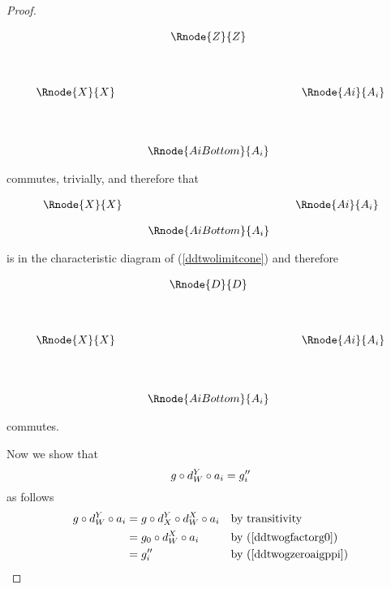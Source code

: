 \documentclass[10pt,a4paper]{scrartcl}
\begin{document}
\begin{proof}
\begin{center}
\begin{equation*}
\begin{array}{cp{0.3cm}c    p{0.3cm}  c }
               & & \Rnode{Z}{Z} & &                                  \\ [1.3cm]
\Rnode{X}{X}   &&                   & & \Rnode{Ai}{A_i}   \\ [1.4cm]
               & & \Rnode{AiBottom}{A_i} & &   
\end{array}
\end{equation*}
\end{center}
 commutes, trivially, and therefore that
\begin{center}
\begin{equation*}
\begin{array}{cp{0.1cm}cp{0.1cm} c}
\Rnode{X}{X}& &                & & \Rnode{Ai}{A_i} \\ [0.4cm]
            & &\Rnode{AiBottom}{A_i}
\end{array}
\end{equation*}
\end{center}

is in the characteristic diagram of (\ref{ddtwolimitcone}) and therefore
\begin{center}
\begin{equation}
\label{ddtwogzeroaigppi}
\begin{array}{cp{0.3cm}c    p{0.3cm}  c }
               & & \Rnode{D}{D} & &                                  \\ [1.3cm]
\Rnode{X}{X}   &&                   & & \Rnode{Ai}{A_i}   \\ [1.4cm]
               & & \Rnode{AiBottom}{A_i} & &   
\end{array}
\end{equation}
\end{center}
 commutes.

\noindent
Now we show that
\begin{equation}
\label{ddtwogaigpp}
g \circ d^{Y}_{W} \circ a_i=g''_i
\end{equation}
as follows
\begin{align*}
g \circ d^{Y}_{W} \circ a_i                      
     &= g \circ d^{Y}_{X} \circ d^{X}_{W} \circ a_i  && \mbox{by transitivity}  \\
     &= g_0 \circ d^{X}_{W} \circ a_i          && \mbox{by (\ref{ddtwogfactorg0})}  \\
		&=g''_i                                      && \mbox{by (\ref{ddtwogzeroaigppi})}  \\
\end{align*}


\end{proof}
\end{document}
